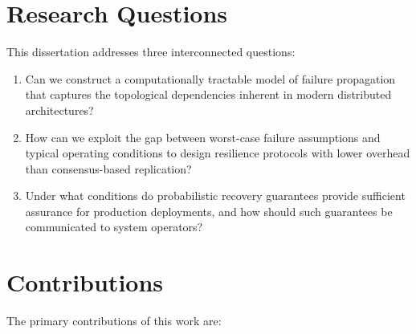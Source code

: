 \documentclass[12pt,letterpaper,oneside]{report}
\begin{document}
\section{Research Questions}

This dissertation addresses three interconnected questions:

\begin{enumerate}[label=\textbf{RQ\arabic*:},leftmargin=*,itemsep=8pt]
  \item Can we construct a computationally tractable model of failure propagation that captures the topological dependencies inherent in modern distributed architectures?
  \item How can we exploit the gap between worst-case failure assumptions and typical operating conditions to design resilience protocols with lower overhead than consensus-based replication?
  \item Under what conditions do probabilistic recovery guarantees provide sufficient assurance for production deployments, and how should such guarantees be communicated to system operators?
\end{enumerate}

\section{Contributions}

The primary contributions of this work are:
\end{document}

